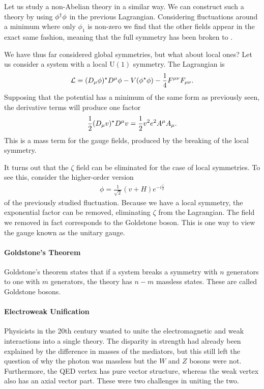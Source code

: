 Let us study a non-Abelian theory in a similar way. We can construct such a theory by using $\phi^{\dagger}\phi$ in the previous Lagrangian. Considering fluctuations around a minimum where only $\phi_{1}$ is non-zero we find that the other fields appear in the exact same fashion, meaning that the full  symmetry has been broken to .

We have thus far considered global symmetries, but what about local ones? Let us consider a system with a local $\text{U}(1)$ symmetry. The Lagrangian is
\begin{align*}
	\mathcal{L} = (D_{\mu}\phi)^{\star} D^{\mu}\phi - V(\phi^{\star}\phi) - \frac{1}{4}F^{\mu\nu}F_{\mu\nu}.
\end{align*}
Supposing that the potential has a minimum of the same form as previously seen, the derivative terms will produce one factor
\begin{align*}
	\frac{1}{2}(D_{\mu}v)^{\star} D^{\mu}v = \frac{1}{2}v^{2}e^{2}A^{\mu}A_{\mu}.
\end{align*}
This is a mass term for the gauge fields, produced by the breaking of the local symmetry.

It turns out that the $\zeta$ field can be eliminated for the case of local symmetries. To see this, consider the higher-order version
\begin{align*}
	\phi = \frac{1}{\sqrt{2}}(v + H)e^{-i\frac{\zeta}{v}}
\end{align*}
of the previously studied fluctuation. Because we have a local symmetry, the exponential factor can be removed, eliminating $\zeta$ from the Lagrangian. The field we removed in fact corresponds to the Goldstone boson. This is one way to view the gauge known as the unitary gauge.

\paragraph{Goldstone's Theorem}
Goldstone's theorem states that if a system breaks a symmetry with $n$ generators to one with $m$ generators, the theory has $n - m$ massless states. These are called Goldstone bosons.

\paragraph{Electroweak Unification}
Physicists in the 20th century wanted to unite the electromagnetic and weak interactions into a single theory. The disparity in strength had already been explained by the difference in masses of the mediators, but this still left the question of why the photon was massless but the $W$ and $Z$ bosons were not. Furthermore, the QED vertex has pure vector structure, whereas the weak vertex also has an axial vector part. These were two challenges in uniting the two.

